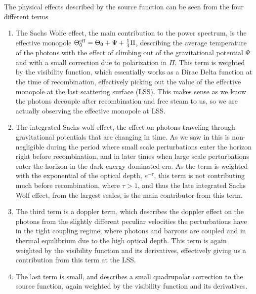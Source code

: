 \documentclass[10pt,a4paper]{article}
\begin{document}
The physical effects described by the source function can be seen from the four different terms
\begin{enumerate}[label=\arabic*]
  \item The Sachs Wolfe effect, the main contribution to the power spectrum, is the effective monopole $\Theta_0^{\rm{eff}} = \Theta_0 + \Psi + \frac{1}{4}\Pi$, describing the average temperature of the photons with the effect of climbing out of the gravitational potential $\Psi$ and with a small correction due to polarization in $\Pi$. This term is weighted by the visibility function, which essentially works as a Dirac Delta function at the time of recombination, effectively picking out the value of the effective monopole at the last scattering surface (LSS). This makes sense as we know the photons decouple after recombination and free steam to us, so we are actually observing the effective monopole at LSS.
  \item The integrated Sachs wolf effect, the effect on photons traveling through gravitational potentials that are changing in time. As we saw in \cite{milestone3} this is non-negligible during the period where small scale perturbations enter the horizon right before recombination, and in later times when large scale perturbations enter the horizon in the dark energy dominated era. As the term is weighted with the exponential of the optical depth, $e^{-\tau}$, this term is not contributing much before recombination, where $\tau > 1$, and thus the late integrated Sachs Wolf effect, from the largest scales, is the main contributor from this term.
  \item The third term is a doppler term, which describes the doppler effect on the photons from the slightly different peculiar velocities the perturbations have in the tight coupling regime, where photons and baryons are coupled and in thermal equilibrium due to the high optical depth. This term is again weighted by the visibility function and its derivatives, effectively giving us a contribution from this term at the LSS.
  \item The last term is small, and describes a small quadrupolar correction to the source function, again weighted by the visibility function and its derivatives.
\end{enumerate}
\end{document}
